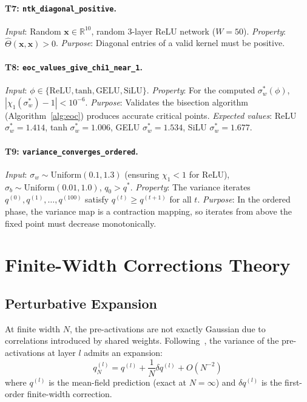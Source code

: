 \documentclass[10pt]{article}
\newcommand{\RR}{\mathbb{R}}
\begin{document}
\paragraph{T7: \texttt{ntk\_diagonal\_positive}.}
\emph{Input}: Random $\mathbf{x} \in \RR^{10}$, random 3-layer ReLU network ($W=50$).
\emph{Property}: $\hat{\Theta}(\mathbf{x}, \mathbf{x}) > 0$.
\emph{Purpose}: Diagonal entries of a valid kernel must be positive.

\paragraph{T8: \texttt{eoc\_values\_give\_chi1\_near\_1}.}
\emph{Input}: $\phi \in \{\text{ReLU}, \text{tanh}, \text{GELU}, \text{SiLU}\}$.
\emph{Property}: For the computed $\sigma_w^*(\phi)$, $|\chi_1(\sigma_w^*) - 1| < 10^{-6}$.
\emph{Purpose}: Validates the bisection algorithm (Algorithm~\ref{alg:eoc}) produces accurate critical points.
\emph{Expected values}: ReLU $\sigma_w^* = 1.414$, tanh $\sigma_w^* = 1.006$, GELU $\sigma_w^* = 1.534$, SiLU $\sigma_w^* = 1.677$.

\paragraph{T9: \texttt{variance\_converges\_ordered}.}
\emph{Input}: $\sigma_w \sim \text{Uniform}(0.1, 1.3)$ (ensuring $\chi_1 < 1$ for ReLU), $\sigma_b \sim \text{Uniform}(0.01, 1.0)$, $q_0 > q^*$.
\emph{Property}: The variance iterates $q^{(0)}, q^{(1)}, \ldots, q^{(100)}$ satisfy $q^{(t)} \geq q^{(t+1)}$ for all $t$.
\emph{Purpose}: In the ordered phase, the variance map is a contraction mapping, so iterates from above the fixed point must decrease monotonically.


\section{Finite-Width Corrections Theory}
\label{app:finite-width-theory}

\subsection{Perturbative Expansion}

At finite width $N$, the pre-activations are not exactly Gaussian due to correlations introduced by shared weights.
Following~\cite{hanin2018neural}, the variance of the pre-activations at layer $l$ admits an expansion:
\begin{equation}
    q_N^{(l)} = q^{(l)} + \frac{1}{N} \delta q^{(l)} + O(N^{-2})
    \label{eq:finite-width-expansion}
\end{equation}
where $q^{(l)}$ is the mean-field prediction (exact at $N = \infty$) and $\delta q^{(l)}$ is the first-order finite-width correction.
\end{document}
